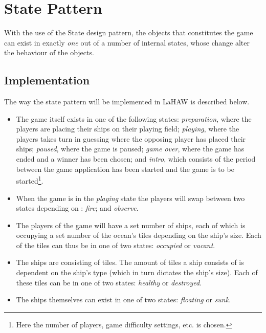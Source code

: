     \section{State Pattern}
    
    With the use of the State design pattern, the objects that constitutes the game can exist in exactly \emph{one} out of a number of internal states, whose change alter the behaviour of the objects.\cite{online:statepattern}
    
    
        \subsection{Implementation}
        The way the state pattern will be implemented in LaHAW is described below.
    
        \begin{itemize}
            \item The game itself exists in one of the following states: \emph{preparation}, where the players are placing their ships on their playing field; \emph{playing}, where the players takes turn in guessing where the opposing player has placed their ships; \emph{paused}, where the game is paused; \emph{game over}, where the game has ended and a winner has been chosen; and \emph{intro}, which consists of the period between the game application has been started and the game is to be started\footnote{Here the number of players, game difficulty settings, etc. is chosen.}.

            \item When the game is in the \emph{playing} state the players will swap between two states depending on : \emph{fire}; and \emph{observe}.
    
            \item The players of the game will have a set number of ships, each of which is occupying a set number of the ocean's tiles depending on the ship's size. Each of the tiles can thus be in one of two states: \emph{occupied} or \emph{vacant}.
    
            \item The ships are consisting of tiles. The amount of tiles a ship consists of is dependent on the ship's type (which in turn dictates the ship's size). Each of these tiles can be in one of two states: \emph{healthy} or \emph{destroyed}.
    
            \item The ships themselves can exist in one of two states: \emph{floating} or \emph{sunk}.            
    
        \end{itemize}
    
